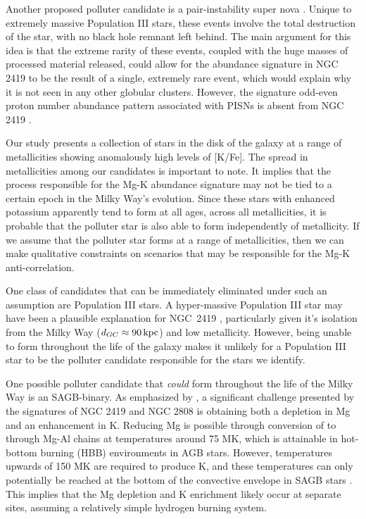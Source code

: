 \documentclass[a4paper,fleqn,usenatbib]{mnras}
\begin{document}
Another proposed  polluter candidate is a pair-instability super nova \citep[PISN;][]{carretta2013}. Unique to extremely massive Population III stars, these events involve the total destruction of the star, with no black hole remnant left behind. The main argument for this idea is that the extreme rarity of these events, coupled with the huge masses of processed material released, could allow for the abundance signature in NGC 2419 to be the result of a single, extremely rare event, which would explain why it is not seen in any other globular clusters. However, the signature odd-even proton number abundance pattern associated with PISNs is absent from NGC 2419 \citep{cohenkirby2012}.

Our study presents a collection of stars in the disk of the galaxy at a range of metallicities showing anomalously high levels of [K/Fe]. The spread in metallicities among our candidates is important to note. It implies that the process responsible for the Mg-K abundance signature may not be tied to a certain epoch in the Milky Way's evolution. Since these stars with enhanced potassium apparently tend to form at all ages, across all metallicities, it is probable that the polluter star is also able to form independently of metallicity. If we assume that the polluter star forms at a range of metallicities, then we can make qualitative constraints on scenarios that may be responsible for the Mg-K anti-correlation.

One class of candidates that can be immediately eliminated under such an assumption are Population III stars. A hyper-massive Population III star may have been a plausible explanation for NGC~2419 \citep{carretta2013}, particularly given it's isolation from the Milky Way ($d_{GC} \approx 90\,{\rm kpc}$) and low metallicity. However, being unable to form throughout the life of the galaxy makes it unlikely for a Population III star to be the polluter candidate responsible for the stars we identify.

One possible polluter candidate that \textit{could} form throughout the life of the Milky Way is an SAGB-binary. As emphasized by \cite{prantzos2017}, a significant challenge presented by the signatures of NGC 2419 and NGC 2808 is obtaining both a depletion in Mg and an enhancement in K. Reducing Mg is possible through conversion of  to  through Mg-Al chains at temperatures around 75 MK, which is attainable in hot-bottom burning (HBB) environments in AGB stars. However, temperatures upwards of 150 MK are required to produce K, and these temperatures can only potentially be reached at the bottom of the convective envelope in SAGB stars \citep{iliadis2016}. This implies that the Mg depletion and K enrichment likely occur at separate sites, assuming a relatively simple hydrogen burning system. 
\end{document}
